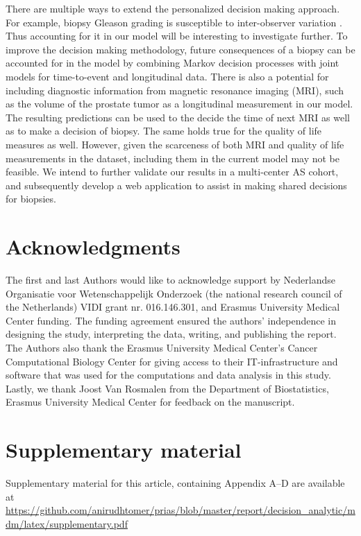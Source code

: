 \documentclass[a4paper, 12pt]{article}
\begin{document}
There are multiple ways to extend the personalized decision making approach. For example, biopsy Gleason grading is susceptible to inter-observer variation \citep{coley2017}. Thus accounting for it in our model will be interesting to investigate further. To improve the decision making methodology, future consequences of a biopsy can be accounted for in the model by combining Markov decision processes with joint models for time-to-event and longitudinal data. There is also a potential for including diagnostic information from magnetic resonance imaging (MRI), such as the volume of the prostate tumor as a longitudinal measurement in our model. The resulting predictions can be used to the decide the time of next MRI as well as to make a decision of biopsy. The same holds true for the quality of life measures as well. However, given the scarceness of both MRI and quality of life measurements in the dataset, including them in the current model may not be feasible. We intend to further validate our results in a multi-center AS cohort, and subsequently develop a web application to assist in making shared decisions for biopsies.

\section*{Acknowledgments}
The first and last Authors would like to acknowledge support by Nederlandse Organisatie voor Wetenschappelijk Onderzoek (the national research council of the Netherlands) VIDI grant nr. 016.146.301, and Erasmus University Medical Center funding. The funding agreement ensured the authors’ independence in designing the study, interpreting the data, writing, and publishing the report. The Authors also thank the Erasmus University Medical Center's Cancer Computational Biology Center for giving access to their IT-infrastructure and software that was used for the computations and data analysis in this study. Lastly, we thank Joost Van Rosmalen from the Department of Biostatistics, Erasmus University Medical Center for feedback on the manuscript.

\section*{Supplementary material}
Supplementary material for this article, containing Appendix A--D are available at \url{https://github.com/anirudhtomer/prias/blob/master/report/decision_analytic/mdm/latex/supplementary.pdf}

\clearpage
\printbibliography
\end{document}
